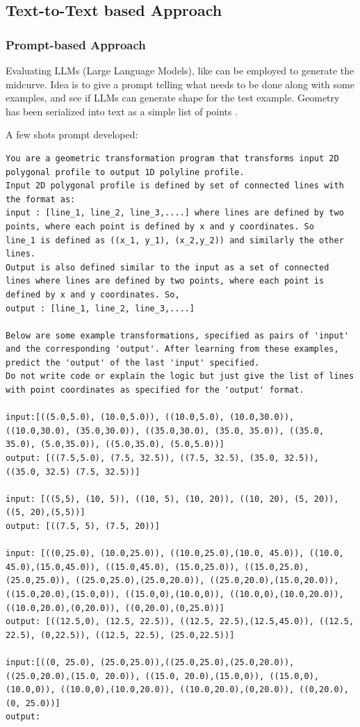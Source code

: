 \documentclass[conference]{IEEEtran}
\begin{document}
\subsection{Text-to-Text  based Approach}
\label{subsec:7}    
    
\subsubsection{Prompt-based Approach}
\label{subsubsec:1} 
Evaluating LLMs (Large Language Models), like can be employed to generate the midcurve. Idea is to give a prompt telling what needs to be done along with some examples, and see if LLMs can generate shape for the test example. Geometry has been serialized into text as a simple list of points \cite{kulkarni2023geometry}.

A few shots prompt developed:
\begin{lstlisting}[basicstyle=\tiny, breaklines=true, breakatwhitespace=true,label=lst:python]
You are a geometric transformation program that transforms input 2D polygonal profile to output 1D polyline profile. 
Input 2D polygonal profile is defined by set of connected lines with the format as:
input : [line_1, line_2, line_3,....] where lines are defined by two points, where each point is defined by x and y coordinates. So
line_1 is defined as ((x_1, y_1), (x_2,y_2)) and similarly the other lines.
Output is also defined similar to the input as a set of connected lines where lines are defined by two points, where each point is defined by x and y coordinates. So,
output : [line_1, line_2, line_3,....]

Below are some example transformations, specified as pairs of 'input' and the corresponding 'output'. After learning from these examples, predict the 'output' of the last 'input' specified.
Do not write code or explain the logic but just give the list of lines with point coordinates as specified for the 'output' format.

input:[((5.0,5.0), (10.0,5.0)), ((10.0,5.0), (10.0,30.0)), ((10.0,30.0), (35.0,30.0)), ((35.0,30.0), (35.0, 35.0)), ((35.0, 35.0), (5.0,35.0)), ((5.0,35.0), (5.0,5.0))]
output: [((7.5,5.0), (7.5, 32.5)), ((7.5, 32.5), (35.0, 32.5)), ((35.0, 32.5) (7.5, 32.5))]

input: [((5,5), (10, 5)), ((10, 5), (10, 20)), ((10, 20), (5, 20)), ((5, 20),(5,5))]
output: [((7.5, 5), (7.5, 20))]

input: [((0,25.0), (10.0,25.0)), ((10.0,25.0),(10.0, 45.0)), ((10.0, 45.0),(15.0,45.0)), ((15.0,45.0), (15.0,25.0)), ((15.0,25.0),(25.0,25.0)), ((25.0,25.0),(25.0,20.0)), ((25.0,20.0),(15.0,20.0)), ((15.0,20.0),(15.0,0)), ((15.0,0),(10.0,0)), ((10.0,0),(10.0,20.0)), ((10.0,20.0),(0,20.0)), ((0,20.0),(0,25.0))]
output: [((12.5,0), (12.5, 22.5)), ((12.5, 22.5),(12.5,45.0)), ((12.5, 22.5), (0,22.5)), ((12.5, 22.5), (25.0,22.5))]

input:[((0, 25.0), (25.0,25.0)),((25.0,25.0),(25.0,20.0)), ((25.0,20.0),(15.0, 20.0)), ((15.0, 20.0),(15.0,0)), ((15.0,0),(10.0,0)), ((10.0,0),(10.0,20.0)), ((10.0,20.0),(0,20.0)), ((0,20.0),(0, 25.0))]
output:


\end{lstlisting}
\end{document}
